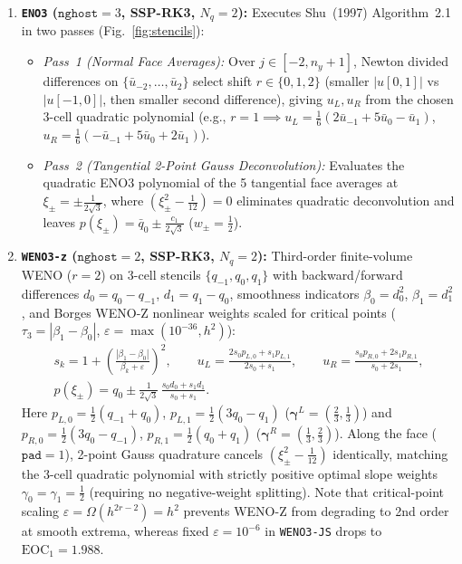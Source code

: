 \documentclass[11pt,a4paper]{article}
\newcommand{\code}[1]{\texttt{#1}}
\theoremstyle{definition}
\begin{document}
\begin{enumerate}
\item \textbf{\code{ENO3} ($\code{nghost}=3$, SSP-RK3, $N_q=2$):} Executes Shu~(1997) Algorithm~2.1 in two passes (Fig.~\ref{fig:stencils}):
\begin{itemize}
\item \emph{Pass~1 (Normal Face Averages):} Over $j\in[-2,n_y+1]$, Newton divided differences on $\{\bar{u}_{-2},\dots,\bar{u}_2\}$ select shift $r\in\{0,1,2\}$ (smaller $|u[0,1]|$ vs $|u[-1,0]|$, then smaller second difference), giving $u_L, u_R$ from the chosen 3-cell quadratic polynomial (e.g., $r=1 \implies u_L = \frac{1}{6}(2\bar{u}_{-1}+5\bar{u}_0-\bar{u}_1)$, $u_R = \frac{1}{6}(-\bar{u}_{-1}+5\bar{u}_0+2\bar{u}_1)$).
\item \emph{Pass~2 (Tangential 2-Point Gauss Deconvolution):} Evaluates the quadratic ENO3 polynomial of the 5 tangential face averages at $\xi_\pm = \pm\frac{1}{2\sqrt{3}}$, where $(\xi_\pm^2 - \frac{1}{12})=0$ eliminates quadratic deconvolution and leaves $p(\xi_\pm) = \bar{q}_0 \pm \frac{c_1}{2\sqrt{3}}$ ($w_\pm = \frac{1}{2}$).
\end{itemize}

\item \textbf{\code{WENO3-z} ($\code{nghost}=2$, SSP-RK3, $N_q=2$):} Third-order finite-volume WENO ($r=2$) on 3-cell stencils $\{q_{-1},q_0,q_1\}$ with backward/forward differences $d_0 = q_0 - q_{-1}$, $d_1 = q_1 - q_0$, smoothness indicators $\beta_0 = d_0^2$, $\beta_1 = d_1^2$, and Borges WENO-Z nonlinear weights scaled for critical points ($\tau_3 = |\beta_1 - \beta_0|$, $\varepsilon = \max(10^{-36}, h^2)$):
\begin{equation}
\label{eq:weno3z}
\boxed{\begin{gathered}
s_k = 1 + \left(\frac{|\beta_1-\beta_0|}{\beta_k + \varepsilon}\right)^2,\qquad
u_L = \frac{2s_0 p_{L,0}+s_1 p_{L,1}}{2s_0+s_1},\qquad
u_R = \frac{s_0 p_{R,0}+2s_1 p_{R,1}}{s_0+2s_1},\\[2pt]
p(\xi_\pm) = q_0 \pm \frac{1}{2\sqrt{3}}\,\frac{s_0 d_0 + s_1 d_1}{s_0 + s_1}.
\end{gathered}}
\end{equation}
Here $p_{L,0}=\frac{1}{2}(q_{-1}+q_0)$, $p_{L,1}=\frac{1}{2}(3q_0-q_1)$ ($\boldsymbol{\gamma}^L=(\frac{2}{3},\frac{1}{3})$) and $p_{R,0}=\frac{1}{2}(3q_0-q_{-1})$, $p_{R,1}=\frac{1}{2}(q_0+q_1)$ ($\boldsymbol{\gamma}^R=(\frac{1}{3},\frac{2}{3})$). Along the face ($\code{pad}=1$), 2-point Gauss quadrature cancels $(\xi_\pm^2-\frac{1}{12})$ identically, matching the 3-cell quadratic polynomial with strictly positive optimal slope weights $\gamma_0=\gamma_1=\frac{1}{2}$ (requiring no negative-weight splitting). Note that critical-point scaling $\varepsilon = \Omega(h^{2r-2}) = h^2$ prevents WENO-Z from degrading to 2nd order at smooth extrema, whereas fixed $\varepsilon=10^{-6}$ in \code{WENO3-JS} drops to $\mathrm{EOC}_1 = 1.988$.


\end{enumerate}
\end{document}
